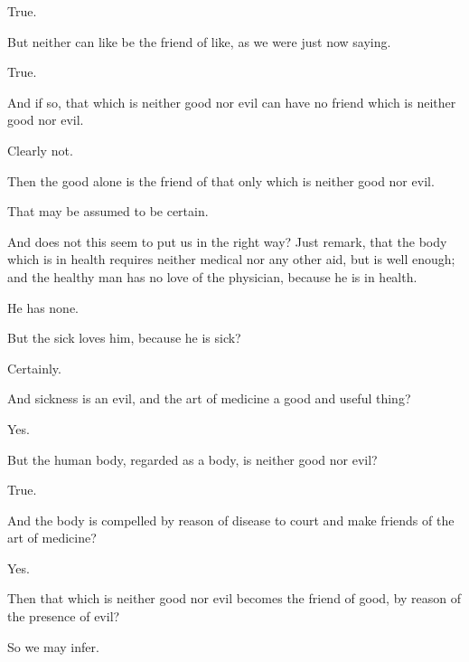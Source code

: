 \documentclass[11pt,letter]{article}
\begin{document}
\par  True.

\par  But neither can like be the friend of like, as we were just now saying.

\par  True.

\par  And if so, that which is neither good nor evil can have no friend which is neither good nor evil.

\par  Clearly not.

\par  Then the good alone is the friend of that only which is neither good nor evil.

\par  That may be assumed to be certain.

\par  And does not this seem to put us in the right way? Just remark, that the body which is in health requires neither medical nor any other aid, but is well enough; and the healthy man has no love of the physician, because he is in health.

\par  He has none.

\par  But the sick loves him, because he is sick?

\par  Certainly.

\par  And sickness is an evil, and the art of medicine a good and useful thing?

\par  Yes.

\par  But the human body, regarded as a body, is neither good nor evil?

\par  True.

\par  And the body is compelled by reason of disease to court and make friends of the art of medicine?

\par  Yes.

\par  Then that which is neither good nor evil becomes the friend of good, by reason of the presence of evil?

\par  So we may infer.
\end{document}

